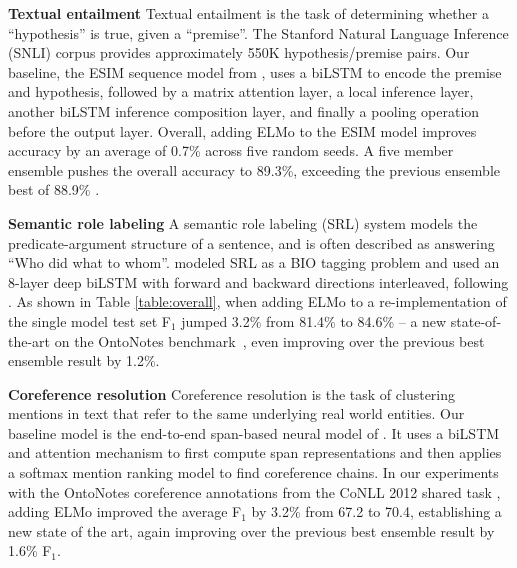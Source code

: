 \documentclass[11pt,a4paper]{article}
\newcommand{\ELMO}{ELMo}
\newcommand{\tinysection}[1]{\textbf{#1}}
\begin{document}

\tinysection{Textual entailment}
Textual entailment is the task of determining whether a ``hypothesis'' is true, given a ``premise''.
The Stanford Natural Language Inference (SNLI) corpus \citep{snliemnlp2015} provides approximately 550K hypothesis/premise pairs. %
Our baseline, the ESIM sequence model
from \citet{Chen2017EnhancedLF}, uses a biLSTM to encode the premise and hypothesis, followed by a matrix attention layer, a local inference layer, another biLSTM inference composition layer, and finally a pooling operation before the output layer.
Overall, adding \ELMO{} to the ESIM model improves accuracy by an average of 0.7\% across five random seeds. %
A five member ensemble pushes the overall accuracy to 89.3\%, exceeding the previous ensemble best of 88.9\% \citep{Gong2017NaturalLI}.


\tinysection{Semantic role labeling}
A semantic role labeling (SRL) system models the predicate-argument structure of a sentence, and is often described as answering
``Who did what to whom''.
\citet{He2017DeepSR} modeled SRL as a BIO tagging problem and used an 8-layer deep biLSTM with forward and backward directions interleaved, following \citet{Zhou2015EndtoendLO}.
As shown in Table \ref{table:overall}, when adding \ELMO{} to a re-implementation of \citet{He2017DeepSR} the single model test set
F$_1$ jumped 3.2\% from 81.4\% to 84.6\% -- a new state-of-the-art on the OntoNotes benchmark~\citep{Pradhan2013TowardsRL}, even improving over the previous best ensemble result by 1.2\%. %

\tinysection{Coreference resolution} Coreference resolution is the task of clustering mentions in text that refer to the same underlying real world entities.
Our baseline model is the end-to-end span-based neural model of \citet{Lee2017EndtoendNC}.
It uses a biLSTM and attention mechanism to first compute span representations and then applies a softmax mention ranking model to find coreference chains.
In our experiments with the OntoNotes coreference annotations from the CoNLL 2012 shared task \citep{Pradhan2012CoNLL2012ST}, adding \ELMO{} improved the average F$_1$ by 3.2\% from 67.2 to 70.4, establishing a new state of the art, again improving over the previous best ensemble result by 1.6\% F$_1$.%
\end{document}

